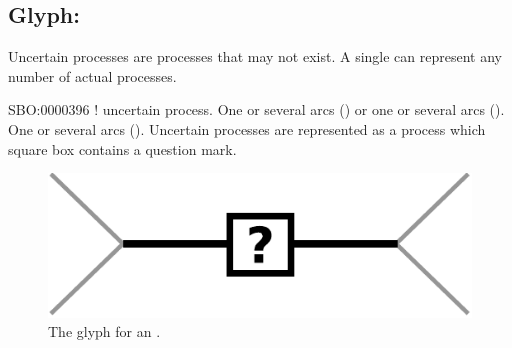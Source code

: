 \subsection{Glyph: }\label{sec:uncertain}

Uncertain processes are processes that may not exist. A single  can represent any number of actual processes.

\begin{glyphDescription}
 \glyphSboTerm SBO:0000396 ! uncertain process.
 \glyphOrigin One or several  arcs () or one or several  arcs ().
 \glyphTarget One or several  arcs ().
 \glyphNode Uncertain processes are represented as a process which square box contains a question mark.
 \end{glyphDescription}

\begin{figure}[H]
  \centering
  \includegraphics[scale = 0.5]{images/uncertain}
  \caption{The \PD glyph for an .}
  \label{fig:uncertain}
\end{figure}

